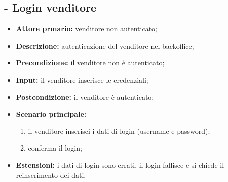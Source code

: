 \subsection{ - Login venditore}
\begin{itemize}
    \item \textbf{Attore prmario:} venditore non autenticato;
    \item \textbf{Descrizione:} autenticazione del venditore nel backoffice;
    \item \textbf{Precondizione:} il venditore non è autenticato;
    \item \textbf{Input:} il venditore inserisce le credenziali;
    \item \textbf{Postcondizione:} il venditore è autenticato;
    \item \textbf{Scenario principale:}
          \begin{enumerate}
              \item il venditore inserisci i dati di login (username e password);
              \item conferma il login;
          \end{enumerate}
    \item \textbf{Estensioni:} i dati di login sono errati, il login fallisce e si chiede il reinserimento dei dati.
\end{itemize}